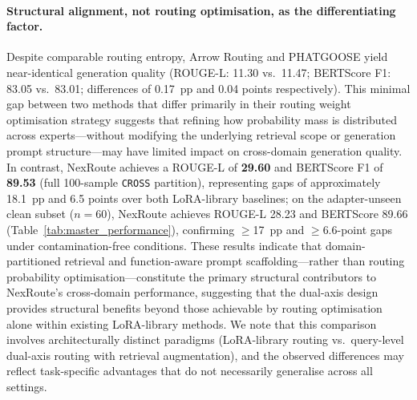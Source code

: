 \documentclass[a4paper,fleql]{cas-sc}
\begin{document}
\paragraph{Structural alignment, not routing optimisation, as the differentiating factor.}
Despite comparable routing entropy, Arrow Routing and PHATGOOSE yield near-identical
generation quality (ROUGE-L: 11.30 vs.\ 11.47; BERTScore F1: 83.05 vs.\ 83.01;
differences of 0.17~pp and 0.04 points respectively). This minimal gap between two
methods that differ primarily in their routing weight optimisation strategy suggests
that refining how probability mass is distributed across experts---without modifying
the underlying retrieval scope or generation prompt structure---may have limited
impact on cross-domain generation quality. In contrast, NexRoute achieves a
ROUGE-L of \textbf{29.60} and BERTScore F1 of \textbf{89.53} (full 100-sample
\texttt{CROSS} partition), representing gaps of approximately 18.1~pp and 6.5
points over both LoRA-library baselines; on the adapter-unseen clean subset
($n{=}60$), NexRoute achieves ROUGE-L 28.23 and BERTScore 89.66 (Table~\ref{tab:master_performance}),
confirming $\geq$17~pp and $\geq$6.6-point gaps under contamination-free conditions.
These results indicate that domain-partitioned retrieval and function-aware
prompt scaffolding---rather than routing probability optimisation---constitute
the primary structural contributors to NexRoute's cross-domain performance,
suggesting that the dual-axis design provides structural benefits
beyond those achievable by routing optimisation alone within existing LoRA-library methods.
We note that this comparison involves architecturally distinct paradigms
(LoRA-library routing vs.\ query-level dual-axis routing with retrieval
augmentation), and the observed differences may reflect task-specific advantages
that do not necessarily generalise across all settings.

\end{document}
